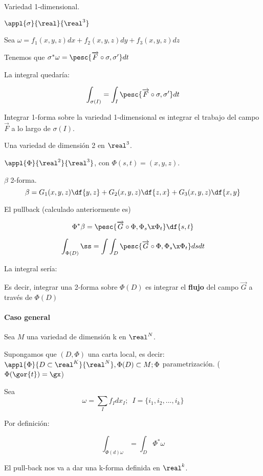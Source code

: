 \begin{example}
Variedad 1-dimensional.

$\appl{\sigma}{\real}{\real^3}$

Sea $\omega = f_1(x,y,z)dx + f_2(x,y,z)dy + f_3(x,y,z)dz$

Tenemos que $\sigma^{\ast}\omega = \pesc{\overrightarrow{F}\circ \sigma,\sigma'}dt$

La integral quedaría:

\[\int_{\sigma(I)} = \int_I  \pesc{\overrightarrow{F}\circ \sigma,\sigma'}dt 
\]

Integrar 1-forma sobre la variedad 1-dimensional es integrar el trabajo del campo $\overrightarrow{F}$ a lo largo de $\sigma(I)$.
\end{example}

\begin{example}
Una variedad de dimensión 2 en $\real^3$.

$\appl{\Phi}{\real^2}{\real^3}$, con $\Phi(s,t) =  (x,y,z)$.

$\beta$ 2-forma. 
\[\beta = G_1(x,y,z) \df{y,z} + G_2(x,y,z) \df{z,x} + G_3(x,y,z) \df{x,y}\]

El pullback (calculado anteriormente es)

\[\Phi^{\ast}\beta = \pesc{\overrightarrow{G}\circ\Phi,\Phi_s\x\Phi_t}\df{s,t}\]

\[\int_{\Phi(D)}ß = \int \int_D \pesc{\overrightarrow{G}\circ\Phi,\Phi_s\x\Phi_t}dsdt\]

La integral sería:


Es decir, integrar una 2-forma sobre $\Phi(D)$ es integrar el \textbf{flujo} del campo $\overrightarrow{G}$ a través de $\Phi(D)$
\end{example}

\paragraph{Caso general}

Sea $M$ una variedad de dimensión k en $\real^N$.

Supongamos que $(D,\Phi)$ una carta local, es decir:
$\appl{\Phi}{D\subset\real^K}{\real^N}, \Phi(D)\subset M; \Phi$ parametrización. ($\Phi(\gor{t}) = \gx$)

Sea \[\omega = \sum_I f_Idx_I; \, \, \, I=\{i_1,i_2,...,i_k\}\]

Por definición:

\[
\int_{\Phi(d) \omega} = \int_D \Phi^{\ast}\omega
\]

El pull-back nos va a dar una k-forma definida en $\real^k$.

